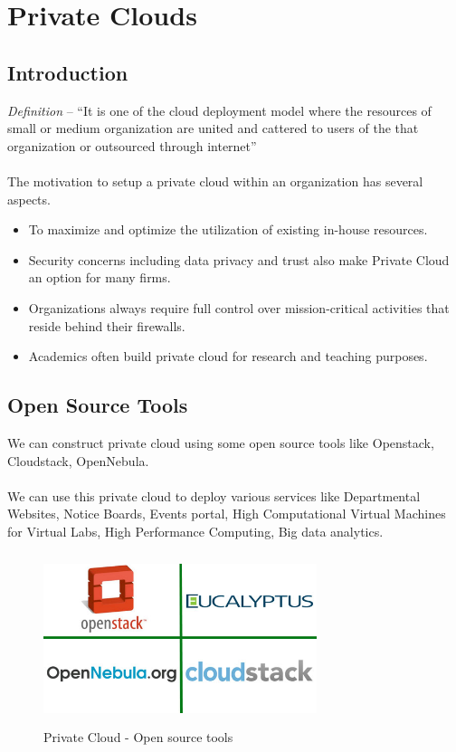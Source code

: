 \documentclass[12pt]{report}
\begin{document}
\newpage
\section{Private Clouds}

\subsection{Introduction}

\textit{Definition} -- ``It is one of the cloud deployment model where the resources of small or medium organization are united and cattered to users of the that organization or outsourced through internet'' \\
\\
The motivation to setup a private cloud within an organization has several aspects. 
\begin{itemize}
\item To maximize and optimize the utilization of existing in-house resources.
\item Security concerns including data privacy and trust also make Private Cloud an option for many firms.
\item Organizations always require full control over mission-critical activities that reside behind their firewalls.
\item Academics often build private cloud for research and teaching purposes.
\end{itemize}

\subsection{Open Source Tools}

We can construct private cloud using some open source tools like Openstack, Cloudstack, OpenNebula. \\
\\
We can use this private cloud to deploy various services like Departmental Websites, Notice Boards, Events portal, High Computational Virtual Machines for Virtual Labs, High Performance Computing, Big data analytics.
\begin{figure}[H]
 \centering
 \includegraphics[width=8cm,height=5cm]{./cloud.jpg}
 \caption{Private Cloud - Open source tools \label{fig:cloud} }
\end{figure}
\end{document}
